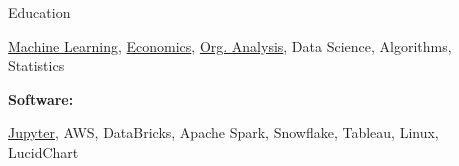 \documentclass{resume/resume}
\begin{document}
\begin{rSection}{Education}
\begin{adjustwidth}{6em}{0pt}
    \href{https://github.com/Spelkington/mlearning}{Machine Learning},
    \href{https://www.youtube.com/watch?v=lMFQp3wN-cg}{Economics},
    \href{https://spelkington.github.io/assets/utah_office_update.pdf}{Org. Analysis},
    Data Science,
    Algorithms,
    Statistics
    
\end{adjustwidth}


%
%
%
\vspace{-3pt}
{\bf Software:}
\vspace{-1.83em}
\begin{adjustwidth}{6em}{0pt}
    \href{https://github.com/search?q=user\%3ASpelkington+user\%3AUtahTriangle+extension\%3Aipynb&type=Code}{Jupyter},
    AWS,
    DataBricks,
    Apache Spark,
    Snowflake,
    Tableau,
    Linux,
    LucidChart

\end{adjustwidth}

\end{rSection}
\end{document}
